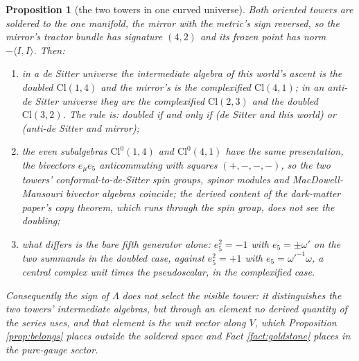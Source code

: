 \documentclass[11pt]{article}
\newtheorem{proposition}[theorem]{Proposition}
\theoremstyle{definition}
\newcommand{\Cl}{\mathrm{Cl}}
\newcommand{\ip}[2]{\langle #1, #2\rangle}
\begin{document}
\begin{proposition}[the two towers in one curved universe]\label{prop:twotowers}
Both oriented towers are soldered to the one manifold, the mirror with the metric's sign reversed, so the mirror's tractor bundle has signature $(4,2)$ and its frozen point has norm $-\ip{I}{I}$. Then:
\begin{enumerate}
\item[(i)] in a de Sitter universe the intermediate algebra of this world's ascent is the doubled $\Cl(1,4)$ and the mirror's is the complexified $\Cl(4,1)$; in an anti-de Sitter universe they are the complexified $\Cl(2,3)$ and the doubled $\Cl(3,2)$. The rule is: doubled if and only if (de Sitter and this world) or (anti-de Sitter and mirror);
\item[(ii)] the even subalgebras $\Cl^{0}(1,4)$ and $\Cl^{0}(4,1)$ have the same presentation, the bivectors $e_{\mu}e_{5}$ anticommuting with squares $(+,-,-,-)$, so the two towers' conformal-to-de-Sitter spin groups, spinor modules and MacDowell-Mansouri bivector algebras coincide; the derived content of the dark-matter paper's copy theorem, which runs through the spin group, does not see the doubling;
\item[(iii)] what differs is the bare fifth generator alone: $e_{5}^{2} = -1$ with $e_{5} = \pm\omega'$ on the two summands in the doubled case, against $e_{5}^{2} = +1$ with $e_{5} = \omega'^{-1}\omega$, a central complex unit times the pseudoscalar, in the complexified case.
\end{enumerate}
Consequently the sign of $\Lambda$ does not select the visible tower: it distinguishes the two towers' intermediate algebras, but through an element no derived quantity of the series uses, and that element is the unit vector along $V$, which Proposition \ref{prop:belongs} places outside the soldered space and Fact \ref{fact:goldstone} places in the pure-gauge sector.
\end{proposition}
\end{document}
